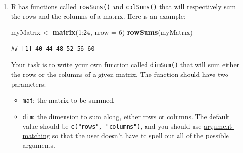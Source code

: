 \documentclass[]{book}
\makeatletter
\newenvironment{Shaded}{\begin{snugshade}}{\end{snugshade}}
\newcommand{\KeywordTok}[1]{\textcolor[rgb]{0.13,0.29,0.53}{\textbf{{#1}}}}
\newcommand{\DataTypeTok}[1]{\textcolor[rgb]{0.13,0.29,0.53}{{#1}}}
\newcommand{\DecValTok}[1]{\textcolor[rgb]{0.00,0.00,0.81}{{#1}}}
\newcommand{\StringTok}[1]{\textcolor[rgb]{0.31,0.60,0.02}{{#1}}}
\newcommand{\NormalTok}[1]{{#1}}
\providecommand{\tightlist}{%
  \setlength{\itemsep}{0pt}\setlength{\parskip}{0pt}}
\newenvironment{kframe}{%
\medskip{}
\setlength{\fboxsep}{.8em}
 \def\at@end@of@kframe{}%
 \ifinner\ifhmode%
  \def\at@end@of@kframe{\end{minipage}}%
  \begin{minipage}{\columnwidth}%
 \fi\fi%
 \def\FrameCommand##1{\hskip\@totalleftmargin \hskip-\fboxsep
 \colorbox{shadecolor}{##1}\hskip-\fboxsep
     \hskip-\linewidth \hskip-\@totalleftmargin \hskip\columnwidth}%
 \MakeFramed {\advance\hsize-\width
   \@totalleftmargin\z@ \linewidth\hsize
   \@setminipage}}%
 {\par\unskip\endMakeFramed%
 \at@end@of@kframe}
\renewenvironment{Shaded}{\begin{kframe}}{\end{kframe}}
\theoremstyle{definition}
\theoremstyle{definition}
\theoremstyle{remark}
\makeatother
\begin{document}
{\begin{enumerate}
\begin{verbatim}
##      [,1] [,2] [,3] [,4]
## [1,]    1    7   13   19
## [2,]    2    8   14   20
## [3,]    3    9   15   21
## [4,]    4   10   16   22
## [5,]    5   11   17   23
## [6,]    6   12   18   24
\end{verbatim}

\begin{Shaded}
\begin{Highlighting}[]
\KeywordTok{t}\NormalTok{(myMatrix)}
\end{Highlighting}
\end{Shaded}

\begin{verbatim}
##      [,1] [,2] [,3] [,4] [,5] [,6]
## [1,]    1    2    3    4    5    6
## [2,]    7    8    9   10   11   12
## [3,]   13   14   15   16   17   18
## [4,]   19   20   21   22   23   24
\end{verbatim}

  Write your own function called \texttt{transpose()} that will perform
  the same task on any given matrix. The function should take a single
  parameter called \texttt{mat}, the matrix to be transposed. \textbf{Of
  course you may NOT use \texttt{t()} in the code for your function!}
\item
  R has functions called \texttt{rowSums()} and \texttt{colSums()} that
  will respectively sum the rows and the columns of a matrix. Here is an
  example:

\begin{Shaded}
\begin{Highlighting}[]
\NormalTok{myMatrix <-}\StringTok{ }\KeywordTok{matrix}\NormalTok{(}\DecValTok{1}\NormalTok{:}\DecValTok{24}\NormalTok{, }\DataTypeTok{nrow =} \DecValTok{6}\NormalTok{)}
\KeywordTok{rowSums}\NormalTok{(myMatrix)}
\end{Highlighting}
\end{Shaded}

\begin{verbatim}
## [1] 40 44 48 52 56 60
\end{verbatim}

  Your task is to write your own function called \texttt{dimSum()} that
  will sum either the rows or the columns of a given matrix. The
  function should have two parameters:

  \begin{itemize}
  \tightlist
  \item
    \texttt{mat}: the matrix to be summed.
  \item
    \texttt{dim}: the dimension to sum along, either rows or columns.
    The default value should be \texttt{c("rows",\ "columns")}, and you
    should use \protect\hyperlink{argument-matching}{argument-matching}
    so that the user doesn't have to spell out all of the possible
    arguments.
  \end{itemize}


\end{enumerate}}
\end{document}
